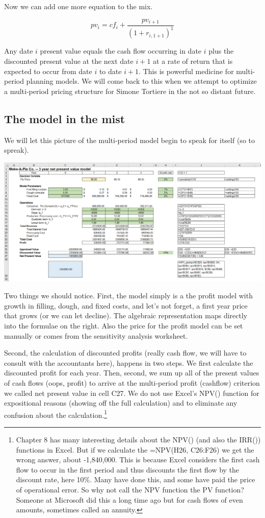 \documentclass[
]{book}
\begin{document}
Now we can add one more equation to the mix.

\[
pv_i =  cf_i + \frac{pv_{i+1}}{(1+r_{i, 1+1})^1}
\]

Any date \(i\) present value equals the cash flow occurring in date \(i\) plus the discounted present value at the next date \(i+1\) at a rate of return that is expected to occur from date \(i\) to date \(i+1\). This is powerful medicine for multi-period planning models. We will come back to this when we attempt to optimize a multi-period pricing structure for Simone Tortiere in the not so distant future.

\hypertarget{the-model-in-the-mist}{%
\subsection{The model in the mist}\label{the-model-in-the-mist}}

We will let this picture of the multi-period model begin to speak for itself (so to spreak).

\includegraphics{images/02/pie-npv-calc.jpg}

Two things we should notice. First, the model simply is a the profit model with growth in filling, dough, and fixed costs, and let's not forget, a first year price that grows (or we can let decline). The algebraic representation maps directly into the formulae on the right. Also the price for the profit model can be set manually or comes from the sensitivity analysis worksheet.

Second, the calculation of discounted profits (really cash flow, we will have to consult with the accountants here), happens in two steps. We first calculate the discounted profit for each year. Then, second, we sum up all of the present values of cash flows (oops, profit) to arrive at the multi-period profit (cashflow) criterion we called net present value in cell C27. We do not use Excel's NPV() function for expositional reasons (showing off the full calculation) and to eliminate any confusion about the calculation.\footnote{\citet{Winston2019} Chapter 8 has many interesting details about the NPV() (and also the IRR()) functions in Excel. But if we calculate the =NPV(H26, C26:F26) we get the wrong answer, about -1,840,000. This is because Excel considers the first cash flow to occur in the first period and thus discounts the first flow by the discount rate, here 10\%. Many have done this, and some have paid the price of operational error. So why not call the NPV function the PV function? Someone at Microsoft did this a long time ago but for cash flows of even amounts, sometimes called an annuity.}
\end{document}

